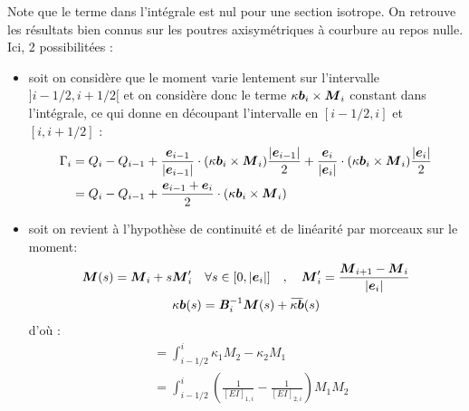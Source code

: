 Note que le terme dans l'intégrale est nul pour une section isotrope. On retrouve les résultats bien connus sur les poutres axisymétriques à courbure au repos nulle.
Ici, 2 possibilitées :
\begin{itemize}
\item soit on considère que le moment varie lentement sur l'intervalle $]i-1/2,i+1/2[$ et on considère donc le terme $\kappa\boldsymbol{b}_i \times \boldsymbol{M}_i$ constant dans l'intégrale, ce qui donne en découpant l'intervalle en $[i-1/2,i]$ et  $[i,i+1/2]$ :
\begin{equation}
	\begin{aligned}
	\Gamma_i
		&= Q_{i} - Q_{i-1}
		+ \frac{\boldsymbol{e}_{i-1}}{|\boldsymbol{e}_{i-1}|} \cdot (\kappa\boldsymbol{b}_i \times \boldsymbol{M}_i ) \frac{|\boldsymbol{e}_{i-1}|}{2}
		+ \frac{\boldsymbol{e}_{i}}{|\boldsymbol{e}_{i}|} \cdot (\kappa\boldsymbol{b}_i \times \boldsymbol{M}_i ) \frac{|\boldsymbol{e}_{i}|}{2}\\
		&= Q_{i} - Q_{i-1}
		+ \frac{\boldsymbol{e}_{i-1} + \boldsymbol{e}_{i}}{2} \cdot (\kappa\boldsymbol{b}_i \times \boldsymbol{M}_i )		\end{aligned}
\end{equation}
\item soit on revient à l'hypothèse de continuité et de linéarité par morceaux sur le moment:
\begin{subequations}
	\begin{gather}
	\vect{M}(s) = \vect{M}_{i} + s \vect{M}'_{i} \quad \forall s \in [0,|\vect{e}_i|]
		\quad , \quad \vect{M}'_{i}= \frac{\vect{M}_{i+1} - \vect{M}_{i}}{|\vect{e}_i|} \\
	\kappa\vect{b}(s) = \mat{B}_i^{-1}\vect{M}(s) + \overbar{\kappa\vect{b}}(s) \\
	\end{gather}
\end{subequations}
d'où :
\begin{equation}
	\begin{aligned}
		&=\int_{i-1/2}^{i} \kappa_{1} M_{2} - \kappa_{2} M_{1} \\
		&= \int_{i-1/2}^{i} (\tfrac{1}{[EI]_{1,i}} - \tfrac{1}{[EI]_{2,i}})M_1M_2
	\end{aligned}
\end{equation}
\end{itemize}





